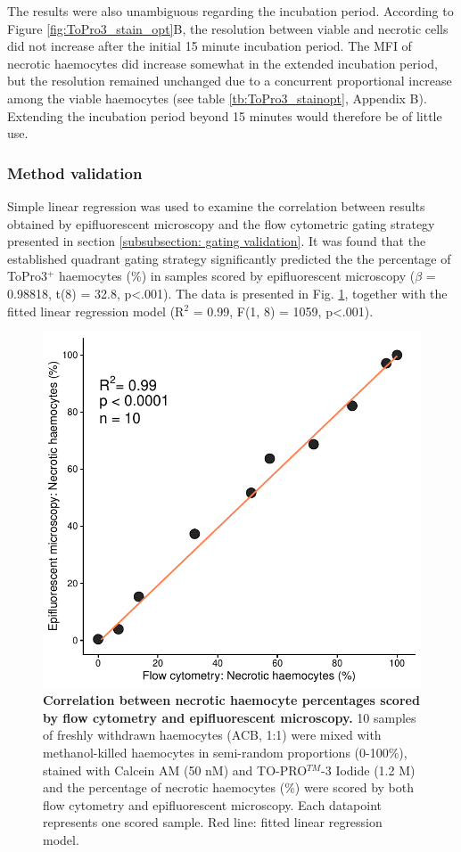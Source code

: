 The results were also unambiguous regarding the incubation period. According to Figure \ref{fig:ToPro3_stain_opt}B, the resolution between viable and necrotic cells did not increase after the initial 15 minute incubation period. The MFI of necrotic haemocytes did increase somewhat in the extended incubation period, but the resolution remained unchanged due to a concurrent proportional increase among the viable haemocytes (see table \ref{tb:ToPro3_stainopt}, Appendix B). Extending the incubation period beyond 15 minutes would therefore be of little use.

\subsubsection{Method validation}
Simple linear regression was used to examine the correlation between results obtained by epifluorescent microscopy and the flow cytometric gating strategy presented in section \ref{subsubsection: gating validation}. It was found that the established quadrant gating strategy significantly predicted the the percentage of ToPro3$^{+}$ haemocytes (\%) in samples scored by epifluorescent microscopy ($\beta$ = 0.98818, t(8) = 32.8, p<.001). The data is presented in Fig. \ref{fig:method_val_1}, together with the fitted linear regression model (R$^{2}$ = 0.99, F(1, 8) = 1059, p<.001).

\begin{figure}[h]
    \centering
    \includegraphics[width=.65\textwidth]{figures/Method development/FCM FM lin reg.pdf}
    \caption{\textbf{Correlation between necrotic haemocyte percentages scored by flow cytometry and epifluorescent microscopy.} 10 samples of freshly withdrawn haemocytes (ACB, 1:1) were mixed with methanol-killed haemocytes in semi-random proportions (0-100\%), stained with Calcein AM (50 nM) and TO-PRO$^{TM}$-3 Iodide (1.2 \micro M) and the percentage of necrotic haemocytes (\%) were scored by both flow cytometry and epifluorescent microscopy. Each datapoint represents one scored sample. Red line: fitted linear regression model.}
    \label{fig:method_val_1}
\end{figure}



